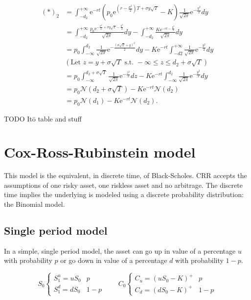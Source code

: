 \documentclass[oneside,titlepage,headinclude,12pt,a4paper,BCOR5mm,footinclude]{book}
\theoremstyle{defn}
\newcommand{\eexp}{\mathrm{e}}
\begin{document}
\begin{align*}
  (*)_2 & = \int_{-d_2}^{+\infty} \eexp^{-rt} \left( p_0 \eexp^{\left(r-\frac{\sigma^2}{2}\right)T + \sigma y\sqrt{T}}-K\right)
    \frac{1}{\sqrt{2\pi}} \eexp^{-\frac{y^2}{2}} dy
    \\ & = \int_{-d_2}^{+\infty} \frac{p_0 \eexp^{-\frac{\sigma^2}{2} + \sigma y\sqrt{T} -\frac{y^2}{2}}}{\sqrt{2\pi}} dy
    - \int_{-d_2}^{+\infty} \frac{K\eexp^{-rt -\frac{y^2}{2}}}{\sqrt{2\pi}}dy
    \\ & = p_0 \int_{-\infty}^{d_2} \frac{1}{\sqrt{2\pi}} \eexp^{-\frac{(\sigma\sqrt{T}+y)^2}{2}}dy
    - K\eexp^{-rt}\int_{-d2}^{+\infty} \frac{1}{\sqrt{2\pi}} \eexp^{-\frac{y^2}{2}} dy
    \\ & \left(\text{Let } z=y+\sigma\sqrt{T} \text{ s.t. } -\infty\leq z \leq d_2+\sigma\sqrt{T}\right)
    \\ & = p_0 \int_{-\infty}^{d_2+\sigma\sqrt{T}} \frac{1}{\sqrt{2\pi}} \eexp^{-\frac{z^2}{2}} dz
    - K\eexp^{-rt}\int_{-\infty}^{d_2} \frac{1}{\sqrt{2\pi}} \eexp^{-\frac{y^2}{2}} dy
    \\ & = p_0 \mathcal{N}(d_2 + \sigma\sqrt{T}) - K\eexp^{-rt} \mathcal{N}(d_2)
    \\ & = p_0 \mathcal{N}(d_1) - K\eexp^{-rt}\mathcal{N}(d_2).
\end{align*}

{\huge TODO It\=o table and stuff}

\section{Cox-Ross-Rubinstein model} 

This model is the equivalent, in  discrete time, of Black-Scholes. CRR accepts
the assumptions of  one risky asset, one riskless asset  and no arbitrage. The
discrete time implies  the underlying is modeled using  a discrete probability
distribution: the Binomial model.

\subsection{Single period model}

In a simple, single period model, the asset can go up in value of a percentage
$u$  with probability  $p$  or go  down  in  value of  a  percentage $d$  with
probability $1-p$.

\[
  S_0 \left\{ \begin{array}{lc}
      S_1^u = uS_0 & p \\ S_1^d= dS_0 & 1-p
    \end{array}
  \quad\quad
  C_0 \left\{ \begin{array}{lc}
      C_u = (uS_0 -K)^+ & p \\ C_d = (dS_0 - K)^+ & 1-p
    \end{array}
\]
\end{document}
